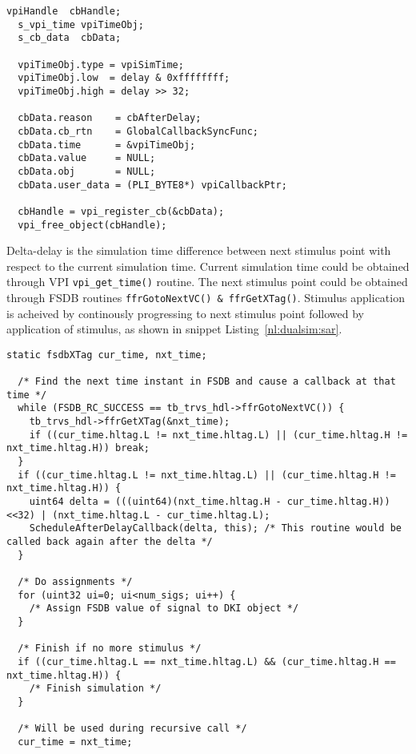 \lstset{language=C++,
basicstyle=\footnotesize,
frame=shadowbox,
breaklines=true}          
\begin{lstlisting}[frame=single, caption=Scheduling a VPI callback,label=nl:dualsim:svc] 
  vpiHandle  cbHandle;
  s_vpi_time vpiTimeObj;
  s_cb_data  cbData;

  vpiTimeObj.type = vpiSimTime;
  vpiTimeObj.low  = delay & 0xffffffff;
  vpiTimeObj.high = delay >> 32;

  cbData.reason    = cbAfterDelay;
  cbData.cb_rtn    = GlobalCallbackSyncFunc;
  cbData.time      = &vpiTimeObj;
  cbData.value     = NULL;
  cbData.obj       = NULL;
  cbData.user_data = (PLI_BYTE8*) vpiCallbackPtr;

  cbHandle = vpi_register_cb(&cbData);
  vpi_free_object(cbHandle);
\end{lstlisting}

Delta-delay is the simulation time difference between next stimulus point with respect to the current simulation time. Current simulation time could be obtained through VPI \verb|vpi_get_time()| routine. The next stimulus point could be obtained through FSDB routines \verb|ffrGotoNextVC() & ffrGetXTag()|. Stimulus application is acheived by continously progressing to next stimulus point followed by application of stimulus, as shown in snippet Listing~\ref{nl:dualsim:sar}.

\lstset{language=C++,
basicstyle=\footnotesize,
frame=shadowbox,
breaklines=true}          
\begin{lstlisting}[frame=single, caption=Stimulus Applicator Routine,label=nl:dualsim:sar] 
  static fsdbXTag cur_time, nxt_time;

  /* Find the next time instant in FSDB and cause a callback at that time */
  while (FSDB_RC_SUCCESS == tb_trvs_hdl->ffrGotoNextVC()) {
    tb_trvs_hdl->ffrGetXTag(&nxt_time);
    if ((cur_time.hltag.L != nxt_time.hltag.L) || (cur_time.hltag.H != nxt_time.hltag.H)) break;
  }
  if ((cur_time.hltag.L != nxt_time.hltag.L) || (cur_time.hltag.H != nxt_time.hltag.H)) {
    uint64 delta = (((uint64)(nxt_time.hltag.H - cur_time.hltag.H))<<32) | (nxt_time.hltag.L - cur_time.hltag.L);
    ScheduleAfterDelayCallback(delta, this); /* This routine would be called back again after the delta */
  }

  /* Do assignments */
  for (uint32 ui=0; ui<num_sigs; ui++) {
    /* Assign FSDB value of signal to DKI object */
  }

  /* Finish if no more stimulus */
  if ((cur_time.hltag.L == nxt_time.hltag.L) && (cur_time.hltag.H == nxt_time.hltag.H)) {
    /* Finish simulation */
  }

  /* Will be used during recursive call */
  cur_time = nxt_time;
\end{lstlisting}

